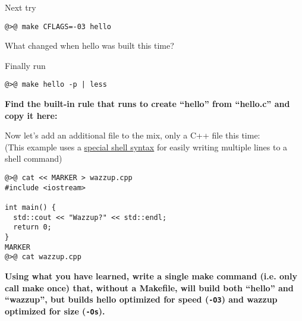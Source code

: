 \documentclass{article}
\begin{document}
Next try
\begin{lstlisting}
@>@ make CFLAGS=-03 hello
\end{lstlisting}
What changed when hello was built this time?

Finally run
\begin{lstlisting}
@>@ make hello -p | less
\end{lstlisting}

\medskip
\textbf{Find the built-in rule that runs to create ``hello'' from ``hello.c''
  and copy it here:}
\vspace{2cm}


Now let's add an additional file to the mix, only a C++ file this time:
\\{(\footnotesize This example uses a
  \href{https://en.wikipedia.org/wiki/Here_document\#Unix_shells}{special
    shell syntax} for easily writing multiple lines to a shell command)}
\begin{lstlisting}
@>@ cat << MARKER > wazzup.cpp
#include <iostream>

int main() {
  std::cout << "Wazzup?" << std::endl;
  return 0;
}
MARKER
@>@ cat wazzup.cpp
\end{lstlisting}

\textbf{Using what you have learned, write a single make command (i.e. only
  call make once) that, without a Makefile, will build both ``hello'' and
  ``wazzup'', but builds hello optimized for speed (\texttt{-O3}) and wazzup
  optimized for size (\texttt{-Os}).
}
\end{document}
